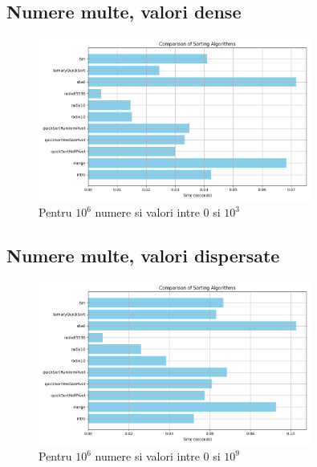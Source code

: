 \documentclass[12pt]{article}
\begin{document}
\subsection{Numere multe, valori dense}
\begin{figure}[H]
    \centering
    \includegraphics[width=0.8\textwidth]{./img/img_20250417_022351.png} %
    \caption{Pentru $10^6$ numere si valori intre 0 si $10^3$}
\end{figure}
\subsection{Numere multe, valori dispersate}
\begin{figure}[H]
    \centering
    \includegraphics[width=0.8\textwidth]{./img/img_20250417_022431.png} %
    \caption{Pentru $10^6$ numere si valori intre 0 si $10^9$}
\end{figure}
\end{document}
